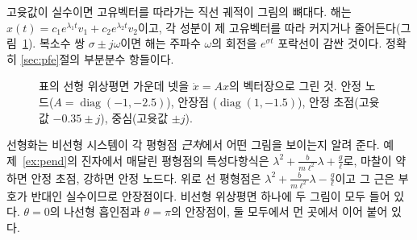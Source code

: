 \documentclass[11pt]{article}
\begin{document}
\noindent 고윳값이 실수이면 고유벡터를 따라가는 직선 궤적이 그림의 뼈대다. 해는
$x(t)=c_1e^{\lambda_1t}v_1+c_2e^{\lambda_2t}v_2$이고, 각 성분이 제 고유벡터를
따라 커지거나 줄어든다(그림~\ref{fig:portraits}). 복소수 쌍 $\sigma\pm j\omega$이면
해는 주파수 $\omega$의 회전을 $e^{\sigma t}$ 포락선이 감싼 것이다. 정확히
\ref{sec:pfe}절의 부분분수 항들이다.

\begin{figure}[htb]
\centering
{}
\caption{표의 선형 위상평면 가운데 넷을 $\dot x=Ax$의 벡터장으로 그린 것.
안정 노드($A=\operatorname{diag}(-1,-2.5)$), 안장점
($\operatorname{diag}(1,-1.5)$), 안정 초점(고윳값 $-0.35\pm j$), 중심(고윳값
$\pm j$).}
\label{fig:portraits}
\end{figure}

\begin{remark}
선형화는 비선형 시스템이 각 평형점 \emph{근처}에서 어떤 그림을 보이는지 알려
준다. 예제~\ref{ex:pend}의 진자에서 매달린 평형점의 특성다항식은
$\lambda^{2}+\frac{b}{m\ell^{2}}\lambda+\frac g\ell$로, 마찰이 약하면 안정 초점,
강하면 안정 노드다. 위로 선 평형점은
$\lambda^{2}+\frac{b}{m\ell^{2}}\lambda-\frac g\ell$이고 그 근은 부호가 반대인
실수이므로 안장점이다. 비선형 위상평면 하나에 두 그림이 모두 들어 있다.
$\theta=0$의 나선형 흡인점과 $\theta=\pi$의 안장점이, 둘 모두에서 먼 곳에서
이어 붙어 있다.
\end{remark}

\end{document}
